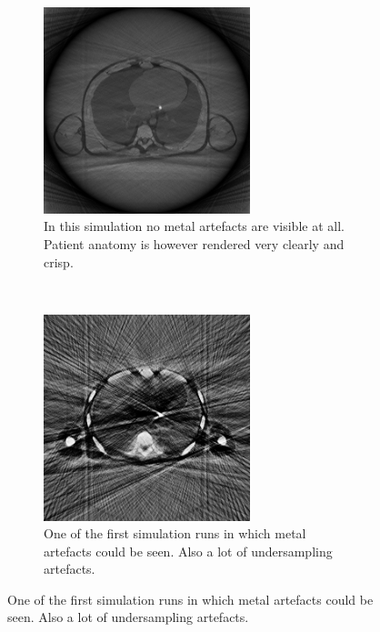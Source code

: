 \begin{figure}[h]
	\centering	
	\begin{subfigure}[h]{0.45\textwidth}
		\centering
		\includegraphics[height=6cm]{images/sim05.png}
		\caption{In this simulation no metal artefacts are visible at all. Patient anatomy is however rendered very clearly and crisp.}
		\label{sim05}
	\end{subfigure}%
	~
	\begin{subfigure}[h]{0.45\textwidth}
		\centering
		\includegraphics[height=6cm]{images/sim06.png}
		\caption{One of the first simulation runs in which metal artefacts could be seen. Also a lot of undersampling artefacts.}
		\label{sim06}
	\end{subfigure}%
\end{figure}
